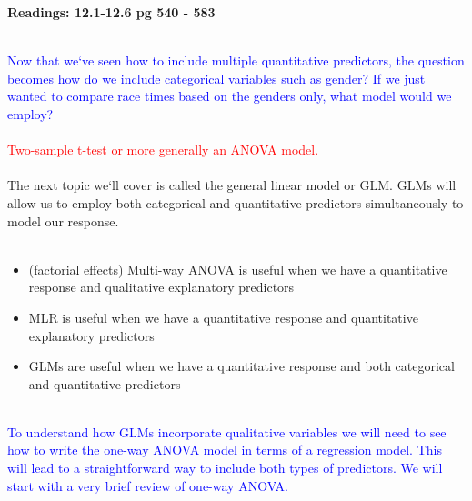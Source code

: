 \begin{center}\large\textbf{Readings: 12.1-12.6 pg 540 - 583}\\
\normalsize \end{center}
\large ~\hrulefill
~\\
\textcolor{blue}{Now that we`ve seen how to include multiple quantitative predictors, the question becomes how do we include categorical variables such as gender?  If we just wanted to compare race times based on the genders only, what model would we employ?}%
\textcolor{red}{\\~\\Two-sample t-test or more generally an ANOVA model.}\\~\\

The next topic we`ll cover is called the general linear model or GLM.  GLMs will allow us to employ both categorical and quantitative predictors simultaneously to model our response.\\~\\

\begin{itemize}
\item (factorial effects) Multi-way ANOVA is useful when we have a quantitative response and qualitative explanatory predictors
\item MLR is useful when we have a quantitative response and quantitative explanatory predictors
\item GLMs are useful when we have a quantitative response and both categorical and quantitative predictors
\end{itemize}

~\\

\textcolor{blue}{To understand how GLMs incorporate qualitative variables we will need to see how to write the one-way ANOVA model in terms of a regression model.  This will lead to a straightforward way to include both types of predictors.  We will start with a very brief review of one-way ANOVA.}

\newpage

